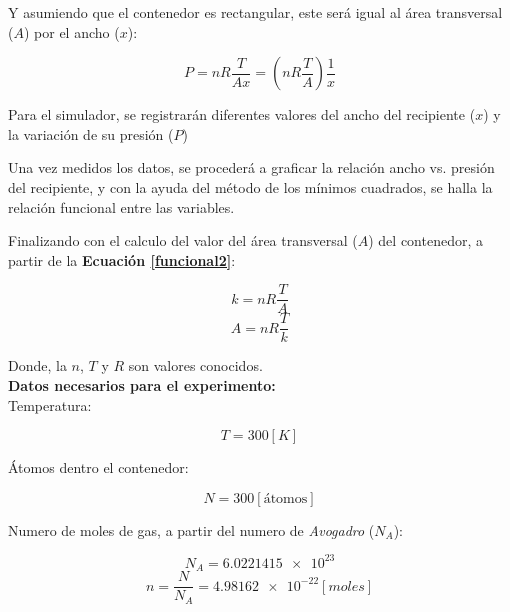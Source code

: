 \documentclass[letter,11pt]{article}
\begin{document}
Y asumiendo que el contenedor es rectangular, este será igual al área
transversal ($A$) por el ancho ($x$):

\begin{equation}
    P = nR\frac{T}{A x} = \left(nR \frac{T}{A}\right) \frac{1}{x}
\label{funcional2}
\end{equation}

Para el simulador, se registrarán diferentes valores del ancho del recipiente
($x$) y la variación de su presión ($P$)

Una vez medidos los datos, se procederá a graficar la relación ancho vs.
presión del recipiente, y con la ayuda del método de los mínimos cuadrados, se
halla la relación funcional entre las variables.

Finalizando con el calculo del valor del área transversal ($A$) del contenedor,
a partir de la \textbf{Ecuación \ref{funcional2}}:

\begin{equation*}
    k = nR \frac{T}{A}
\end{equation*}
\begin{equation}
    A = nR \frac{T}{k}
\label{area}
\end{equation}

Donde, la $n$, $T$ y $R$ son valores conocidos.
\\

\textbf{Datos necesarios para el experimento:} \\

Temperatura:

\begin{equation*}
    T = 300 [K]
\end{equation*}
\vspace{0.10cm}

Átomos dentro el contenedor:

\begin{equation*}
    N = 300 [\text{átomos}]
\end{equation*}
\vspace{0.10cm}

Numero de moles de gas, a partir del numero de \emph{Avogadro} ($N_A$):

\begin{equation*}
    N_A = \num{6.0221415e23}
\end{equation*}
\begin{equation*}
    n = \frac{N}{N_A} = \num{4.98162e-22} [moles]
\end{equation*}
\vspace{0.10cm}
\end{document}
